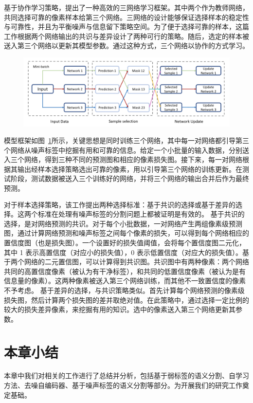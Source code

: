 \citet{Zhang2020RobustMI} 基于协作学习策略，提出了一种高效的三网络学习框架。其中两个作为教师网络，共同选择可靠的像素样本给第三个网络。三网络的设计能够保证选择样本的稳定性与可靠性，并且为平衡噪声与信息留下策略空间。为了便于选择可靠的样本，这篇工作根据两个网络输出的共识与差异设计了两种可行的策略。随后，选定的样本被送入第三个网络以更新其模型参数。通过这种方式，三个网络以协作的方式学习。
    \begin{figure}[tbp]
        \centering 
        \includegraphics[width=1.0\textwidth]{img/c2/rel_c3.png}
        \label{c2_fig13}
    \end{figure}
模型框架如图~\ref{c2_fig13}所示，关键思想是同时训练三个网络，其中每一对网络都引导第三个网络从噪声标签中挖掘有用和可靠的信息。给定一个小批量的输入数据，分别送入三个网络，得到三种不同的预测图和相应的像素损失图。接下来，每一对网络根据其输出经样本选择策略选出可靠的像素，用以引导第三个网络的训练更新。在测试阶段，测试数据被送入三个训练好的网络，并将三个网络的输出合并后作为最终预测。

对于样本选择策略，该工作提出两种选择标准：基于共识的选择或基于差异的选择。这两个标准在处理有噪声标签的分割问题上都被证明是有效的。
基于共识的选择，是对网络预测的共识。对于每个小批数据，一对网络产生两组像素级预测图，通过计算网络预测和噪声标签之间每个像素的损失，可以得到每个网络相应的置信度图（也是损失图）。一个设置好的损失值阈值，会将每个置信度图二元化，其中 1 表示高置信度（对应小的损失值），0 表示低置信度（对应大的损失值）。基于两个网络的二元置信图，可以计算得到共识图。共识图中有两种像素：两个网络共同的高置信度像素（被认为有干净标签），和共同的低置信度像素（被认为是有信息量的像素）。这两种像素被送入第三个网络训练，而其他不一致置信度的像素不予考虑。
基于差异的选择，与共识策略类似。首先计算每个网络预测的像素级损失图，然后计算两个损失图的差并取绝对值。在此策略中，通过选择一定比例的较大的损失差异像素，来挖掘有用的知识。选中的像素送入第三个网络更新其参数。


\section{本章小结}
本章中我们对相关的工作进行了总结并分析，包括基于弱标签的语义分割、自学习方法、去噪自编码器、基于噪声标签的语义分割等部分。为开展我们的研究工作奠定基础。

